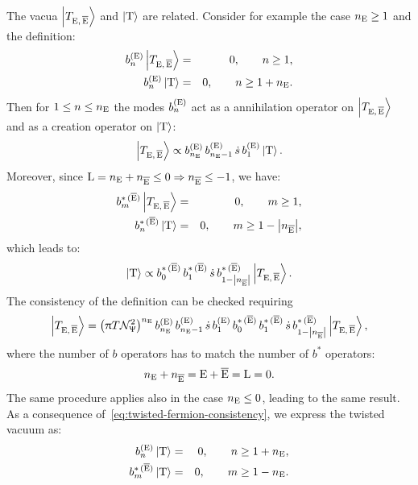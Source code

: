 The vacua $\ket{T_{\mathrm{E},\, \overline{\mathrm{E}}}}$ and $\ket{\mathrm{T}}$ are related.
Consider for example the case $n_{\mathrm{E}} \ge 1$ and the definition:
\begin{eqnarray}
  b^{(\mathrm{E})}_n \ket{T_{\mathrm{E},\, \overline{\mathrm{E}}}} & = & 0, \qquad n \ge 1,
  \\
  b^{(\mathrm{E})}_n \ket{\mathrm{T}} & = & 0, \qquad n \ge 1 + n_{\mathrm{E}}.
\end{eqnarray}
Then for $1 \le n \le n_{\mathrm{E}}$ the modes $b^{(\mathrm{E})}_n$ act as a annihilation operator on $\ket{T_{\mathrm{E},\, \overline{\mathrm{E}}}}$ and as a creation operator on $\ket{\mathrm{T}}$:
\begin{equation}
  \ket{T_{\mathrm{E},\, \overline{\mathrm{E}}}}
  \propto
  b^{(\mathrm{E})}_{n_{\mathrm{E}}}\, b^{(\mathrm{E})}_{n_{\mathrm{E}} - 1}\, \dot{s}\, b^{(\mathrm{E})}_1
  \ket{\mathrm{T}}.
  \label{eq:usual-twisted-vacuum-relation}
\end{equation}
Moreover, since $\mathrm{L} = n_{\mathrm{E}} + n_{\overline{\mathrm{E}}} \le 0 \Rightarrow n_{\overline{\mathrm{E}}} \le -1$, we have:
\begin{eqnarray}
  b^{*\, ( \overline{\mathrm{E}} )}_m \ket{T_{\mathrm{E},\, \overline{\mathrm{E}}}} & = & 0, \qquad m \ge 1,
  \\
  b^{*\, ( \overline{\mathrm{E}} )}_n \ket{\mathrm{T}} & = & 0, \qquad m \ge 1 - \abs{n_{\overline{\mathrm{E}}}},
\end{eqnarray}
which leads to:
\begin{equation}
  \ket{\mathrm{T}}
  \propto
  b^{*\, ( \overline{\mathrm{E}} )}_0\, b^{*\, ( \overline{\mathrm{E}} )}_1\, \dot{s}\, b^{*\, ( \overline{\mathrm{E}} )}_{1 - \abs{n_{\overline{\mathrm{E}}}}}
  \ket{T_{\mathrm{E},\, \overline{\mathrm{E}}}}.
  \label{eq:usual-twisted-fermion-conformal-twisted}
\end{equation}
The consistency of the definition can be checked requiring
\begin{equation}
  \ket{T_{\mathrm{E},\, \overline{\mathrm{E}}}}
  =
  \qty( \uppi T \mathcal{N}_{\Uppsi}^2 )^{n_{\mathrm{E}}}\,
  b^{(\mathrm{E})}_{n_{\mathrm{E}}}\,
  b^{(\mathrm{E})}_{n_{\mathrm{E}}-1}\,
  \dot{s}\,
  b^{(\mathrm{E})}_1\,
  b^{*\, ( \overline{\mathrm{E}} )}_0\,
  b^{*\, ( \overline{\mathrm{E}} )}_1\,
  \dot{s}\,
  b^{*\, ( \overline{\mathrm{E}} )}_{1 - \abs{n_{\overline{\mathrm{E}}}}}
  \ket{T_{\mathrm{E},\, \overline{\mathrm{E}}}},
\end{equation}
where the number of $b$ operators has to match the number of $b^*$
 operators:
\begin{equation}
  n_{\mathrm{E}} + n_{\overline{\mathrm{E}}}
  =
  \mathrm{E} + \overline{\mathrm{E}}
  =
  \mathrm{L}
  =
  0.
  \label{eq:twisted-fermion-consistency}
\end{equation}
The same procedure applies also in the case $n_{\mathrm{E}} \le 0$, leading to the same result.
As a consequence of~\eqref{eq:twisted-fermion-consistency}, we express the twisted vacuum as:
\begin{eqnarray}
  b^{(\mathrm{E})}_n \ket{\mathrm{T}} & = & 0, \qquad n \ge 1 + n_{\mathrm{E}},
  \\
  b^{*\, ( \overline{\mathrm{E}} )}_m \ket{\mathrm{T}} & = & 0, \qquad m \ge 1 - n_{\mathrm{E}}.
\end{eqnarray}
      

